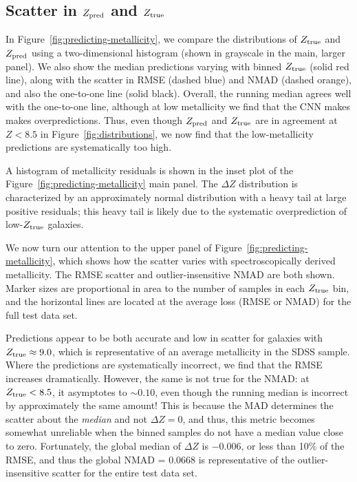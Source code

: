 \documentclass[fleqn,usenatbib]{mnras}
\begin{document}
\subsection{Scatter in $Z_{\rm pred}$ and $Z_{\rm true}$}


In Figure~\ref{fig:predicting-metallicity}, we compare the distributions of $Z_{\rm true}$ and $Z_{\rm pred}$ using a two-dimensional histogram (shown in grayscale in the main, larger panel).
We also show the median predictions varying with binned $Z_{\rm true}$ (solid red line), along with the scatter in RMSE (dashed blue) and NMAD (dashed orange), and also the one-to-one line (solid black).
Overall, the running median agrees well with the one-to-one line, although at low metallicity we find that the CNN makes makes overpredictions.
Thus, even though $Z_{\rm pred}$ and $Z_{\rm true}$ are in agreement at $Z < 8.5$ in Figure~\ref{fig:distributions}, we now find that the low-metallicity predictions are systematically too high.

A histogram of metallicity residuals is shown in the inset plot of the Figure~\ref{fig:predicting-metallicity} main panel.
The $\Delta Z$ distribution is characterized by an approximately normal distribution with a heavy tail at large positive residuals; this heavy tail is likely due to the systematic overprediction of low-$Z_{\rm true}$ galaxies.

We now turn our attention to the upper panel of Figure~\ref{fig:predicting-metallicity}, which shows how the scatter varies with spectroscopically derived metallicity.
The RMSE scatter and outlier-insensitive NMAD are both shown.
Marker sizes are proportional in area to the number of samples in each $Z_{\rm true}$ bin, and the horizontal lines are located at the average loss (RMSE or NMAD) for the full test data set.

Predictions appear to be both accurate and low in scatter for galaxies with $Z_{\rm true} \approx 9.0$, which is representative of an average metallicity in the SDSS sample.
Where the predictions are systematically incorrect, we find that the RMSE increases dramatically.
However, the same is not true for the NMAD: at $Z_{\rm true} < 8.5$, it asymptotes to $\sim 0.10$, even though the running median is incorrect by approximately the same amount!
This is because the MAD determines the scatter about the \textit{median} and not $\Delta Z = 0$, and thus, this metric becomes somewhat unreliable when the binned samples do not have a median value close to zero.
Fortunately, the global median of $\Delta Z$ is $-0.006$, or less than 10\% of the RMSE, and thus the global NMAD = 0.0668 is representative of the outlier-insensitive scatter for the entire test data set.
\end{document}

